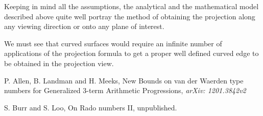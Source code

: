 \documentclass[12pt]{report}
\begin{document}
Keeping in mind all the assumptions, the analytical and the mathematical model described above quite well portray the method of obtaining the projection along any viewing direction or onto any plane of interest.
\\
\vspace{0.3cm}

We must see that curved surfaces would require an infinite number of applications of the projection formula to get a proper well defined curved edge to be obtained in the projection view.
\\
\vspace{0.2cm}

%

\nextpage

\begin{thebibliography}{9}


P. Allen, B. Landman and H. Meeks, New Bounds on van der Waerden type numbers for Generalized $3$-term Arithmetic Progressions, {\it arXiv: 1201.3842v2}


S. Burr and S. Loo, On Rado numbers II, unpublished.

\end{thebibliography}
\end{document}
